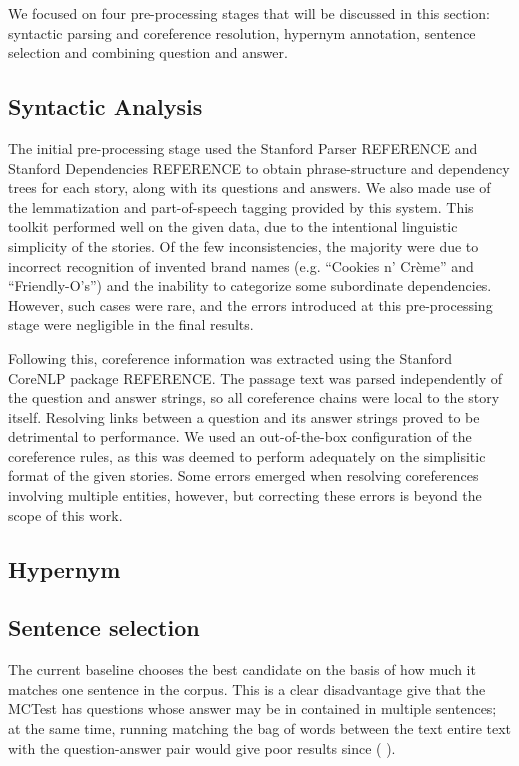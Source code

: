 \documentclass[11pt]{article}
\begin{document}
We focused on four pre-processing stages that will be discussed in this section: %
syntactic parsing and coreference resolution, hypernym annotation, sentence selection and combining question and answer.

\subsection{Syntactic Analysis}

The initial pre-processing stage used the Stanford Parser REFERENCE and Stanford Dependencies REFERENCE to obtain phrase-structure and dependency trees for each story, along with its questions and answers. We also made use of the lemmatization and part-of-speech tagging provided by this system. This toolkit performed well on the given data, due to the intentional linguistic simplicity of the stories. Of the few inconsistencies, the majority were due to incorrect recognition of invented brand names (e.g. “Cookies n’ Crème” and “Friendly-O’s”) and the inability to categorize some subordinate dependencies. However, such cases were rare, and the errors introduced at this pre-processing stage were negligible in the final results.

Following this, coreference information was extracted using the Stanford CoreNLP package REFERENCE. The passage text was parsed independently of the question and answer strings, so all coreference chains were local to the story itself. Resolving links between a question and its answer strings proved to be detrimental to performance. We used an out-of-the-box configuration of the coreference rules, as this was deemed to perform adequately on the simplisitic format of the given stories. Some errors emerged when resolving coreferences involving multiple entities, however, but correcting these errors is beyond the scope of this work.

\subsection{Hypernym}
\subsection{Sentence selection}
The current baseline chooses the best candidate on the basis of how much it matches one sentence in the corpus.
This is a clear disadvantage give that the MCTest has questions whose answer may be in contained in multiple sentences;
at the same time, running matching the bag of words between the text entire text with the question-answer pair would give poor results  since (%
).
\end{document}

